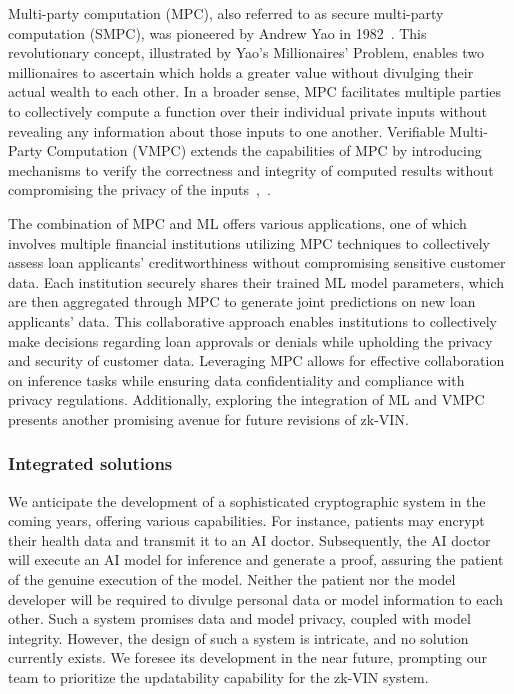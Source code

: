 \documentclass[conference]{IEEEtran}
\begin{document}
Multi-party computation (MPC), also referred to as secure multi-party computation (SMPC), was pioneered by Andrew Yao in 1982~\cite{Yao1982ProtocolsFS}. This revolutionary concept, illustrated by Yao's Millionaires' Problem, enables two millionaires to ascertain which holds a greater value without divulging their actual wealth to each other. In a broader sense, MPC facilitates multiple parties to collectively compute a function over their individual private inputs without revealing any information about those inputs to one another. Verifiable Multi-Party Computation (VMPC) extends the capabilities of MPC by introducing mechanisms to verify the correctness and integrity of computed results without compromising the privacy of the inputs~\cite{Schoenmakers2015UniversallyVM},~\cite{Laud2014VerifiableCI}.

The combination of MPC and ML offers various applications, one of which involves multiple financial institutions utilizing MPC techniques to collectively assess loan applicants' creditworthiness without compromising sensitive customer data. Each institution securely shares their trained ML model parameters, which are then aggregated through MPC to generate joint predictions on new loan applicants' data. This collaborative approach enables institutions to collectively make decisions regarding loan approvals or denials while upholding the privacy and security of customer data. Leveraging MPC allows for effective collaboration on inference tasks while ensuring data confidentiality and compliance with privacy regulations. Additionally, exploring the integration of ML and VMPC presents another promising avenue for future revisions of zk-VIN.


\subsubsection{Integrated solutions}

We anticipate the development of a sophisticated cryptographic system in the coming years, offering various capabilities. For instance, patients may encrypt their health data and transmit it to an AI doctor. Subsequently, the AI doctor will execute an AI model for inference and generate a proof, assuring the patient of the genuine execution of the model. Neither the patient nor the model developer will be required to divulge personal data or model information to each other. Such a system promises data and model privacy, coupled with model integrity. However, the design of such a system is intricate, and no solution currently exists. We foresee its development in the near future, prompting our team to prioritize the updatability capability for the zk-VIN system.
\end{document}
